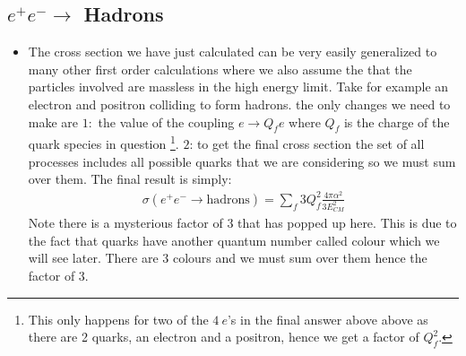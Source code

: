 \documentclass[11pt]{article}
\numberwithin{equation}{section}
\begin{document}
\subsection{$e^+ e^- \rightarrow $ Hadrons} %
\label{sub:_e_e_rightarrow_hadrons}
\begin{itemize}
    \item The cross section we have just calculated can be very easily generalized to many other first order calculations where we also assume the that the particles involved are massless in the high energy limit. Take for example an electron and positron colliding to form hadrons. the only changes we need to make are $1:$ the value of the coupling $e \rightarrow Q_f e$ where $Q_f$ is the charge of the quark species in question \footnote{This only happens for two of the $4~e$'s in the final answer above above as there are 2 quarks, an electron and a positron, hence we get a factor of $Q_f^2$.}. $2$: to get the final cross section the set of all processes includes all possible quarks that we are considering so we must sum over them. The final result is simply:
    \begin{align*}
         \sigma(e^+e^- \rightarrow \text{hadrons}) =  \sum_f3Q_f^2\frac{4\pi\alpha^2}{3E_{CM}^2}
      \end{align*}  
      Note there is a mysterious factor of $3$ that has popped up here. This is due to the fact that quarks have another quantum number called colour which we will see later. There are $3$ colours and we must sum over them hence the factor of $3$. 
\end{itemize} 


\newpage
\end{document}
